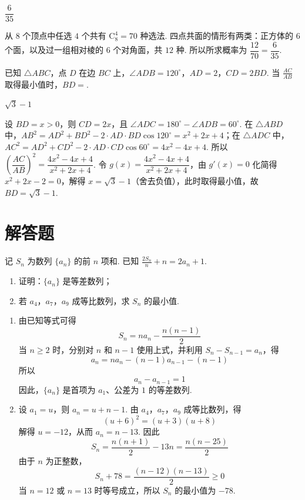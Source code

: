 \begin{answer}
\(\dfrac{6}{35}\)
\end{answer}

\begin{solution}
从 \(8\) 个顶点中任选 \(4\) 个共有 \(\mathrm C_8^4=70\) 种选法. 四点共面的情形有两类：正方体的 \(6\) 个面，以及过一组相对棱的 \(6\) 个对角面，共 \(12\) 种. 所以所求概率为 \(\dfrac{12}{70}=\dfrac6{35}\).
\end{solution}

\begin{problem}
已知 \(\triangle ABC\)，点 \(D\) 在边 \(BC\) 上，\(\angle ADB=120^\circ\)，\(AD=2\)，\(CD=2BD\). 当 \(\frac{AC}{AB}\) 取得最小值时，\(BD=\)\fillinblank{}.
\end{problem}

\begin{answer}
\(\sqrt3-1\)
\end{answer}

\begin{solution}
设 \(BD=x>0\)，则 \(CD=2x\)，且 \(\angle ADC=180^\circ-\angle ADB=60^\circ\). 在 \(\triangle ABD\) 中，\(AB^2=AD^2+BD^2-2\cdot AD\cdot BD\cos120^\circ=x^2+2x+4\)；在 \(\triangle ADC\) 中，\(AC^2=AD^2+CD^2-2\cdot AD\cdot CD\cos60^\circ=4x^2-4x+4\). 所以 \(\left(\dfrac{AC}{AB}\right)^2=\dfrac{4x^2-4x+4}{x^2+2x+4}\). 令 \(g(x)=\dfrac{4x^2-4x+4}{x^2+2x+4}\)，由 \(g'(x)=0\) 化简得 \(x^2+2x-2=0\)，解得 \(x=\sqrt3-1\)（舍去负值），此时取得最小值，故 \(BD=\sqrt3-1\).
\end{solution}

\section{解答题}

\begin{problem}
记 \(S_n\) 为数列 \(\{a_n\}\) 的前 \(n\) 项和. 已知 \(\frac{2S_n}{n}+n=2a_n+1\).

\begin{enumerate}
\item 证明：\(\{a_n\}\) 是等差数列；
\item 若 \(a_4\)，\(a_7\)，\(a_9\) 成等比数列，求 \(S_n\) 的最小值.
\end{enumerate}
\end{problem}

\begin{solution}
\begin{enumerate}
\item 由已知等式可得
\[
S_n=na_n-\frac{n(n-1)}{2}
\]
当 \(n\ge2\) 时，分别对 \(n\) 和 \(n-1\) 使用上式，并利用 \(S_n-S_{n-1}=a_n\)，得
\[
a_n=na_n-(n-1)a_{n-1}-(n-1)
\]
所以
\[
a_n-a_{n-1}=1
\]
因此，\(\{a_n\}\) 是首项为 \(a_1\)、公差为 \(1\) 的等差数列.
\item 设 \(a_1=u\)，则 \(a_n=u+n-1\). 由 \(a_4\)，\(a_7\)，\(a_9\) 成等比数列，得
\[
(u+6)^2=(u+3)(u+8)
\]
解得 \(u=-12\)，从而 \(a_n=n-13\). 因此
\[
S_n=\frac{n(n+1)}{2}-13n=\frac{n(n-25)}{2}
\]
由于 \(n\) 为正整数，
\[
S_n+78=\frac{(n-12)(n-13)}{2}\ge0
\]
当 \(n=12\) 或 \(n=13\) 时等号成立，所以 \(S_n\) 的最小值为 \(-78\).
\end{enumerate}
\end{solution}

